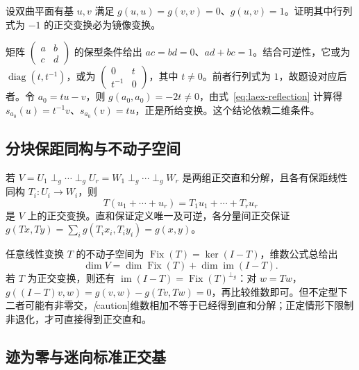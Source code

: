 \begin{example}
\label{ex:laex-hyperbolic-reflection}
设双曲平面有基 $u,v$ 满足 $g(u,u)=g(v,v)=0$、$g(u,v)=1$。证明其中行列式为 $-1$ 的正交变换必为镜像变换。
\end{example}
\begin{solve}
矩阵 $\begin{pmatrix}a&b\\c&d\end{pmatrix}$ 的保型条件给出 $ac=bd=0$、$ad+bc=1$。结合可逆性，它或为 $\operatorname{diag}(t,t^{-1})$，或为 $\begin{pmatrix}0&t\\t^{-1}&0\end{pmatrix}$，其中 $t\ne0$。前者行列式为 $1$，故题设对应后者。令 $a_0=tu-v$，则 $g(a_0,a_0)=-2t\ne0$，由式~\eqref{eq:laex-reflection} 计算得 $s_{a_0}(u)=t^{-1}v$、$s_{a_0}(v)=tu$，正是所给变换。这个结论依赖二维条件。
\end{solve}

\subsection{分块保距同构与不动子空间}

若 $V=U_1\mathbin{\perp_g}\cdots\mathbin{\perp_g}U_r=W_1\mathbin{\perp_g}\cdots\mathbin{\perp_g}W_r$ 是两组正交直和分解，且各有保距线性同构 $T_i:U_i\to W_i$，则
\[
 T(u_1+\cdots+u_r)=T_1u_1+\cdots+T_ru_r
\]
是 $V$ 上的正交变换。直和保证定义唯一及可逆，各分量间正交保证 $g(Tx,Ty)=\sum_i g(T_ix_i,T_iy_i)=g(x,y)$。

任意线性变换 $T$ 的不动子空间为 $\operatorname{Fix}(T)=\ker(I-T)$，维数公式总给出
\[
 \dim V=\dim\operatorname{Fix}(T)+\dim\operatorname{im}(I-T).
\]
若 $T$ 为正交变换，则还有 $\operatorname{im}(I-T)=\operatorname{Fix}(T)^{\perp_g}$：对 $w=Tw$，$g((I-T)v,w)=g(v,w)-g(Tv,Tw)=0$，再比较维数即可。但不定型下二者可能有非零交，\emph[caution]{维数相加不等于已经得到直和分解}；正定情形下限制非退化，才可直接得到正交直和。

\subsection{迹为零与迷向标准正交基}

